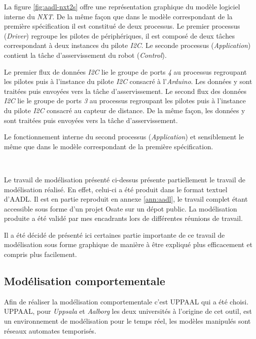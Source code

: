       La figure \ref{fig:aadl-nxt2s} offre une représentation graphique du
      modèle logiciel interne du {\it NXT}. De la même façon que dans le modèle
      correspondant de la première spécification il est constitué de deux
      processus. Le premier processus ({\it Driver}) regroupe les pilotes de
      périphériques, il est composé de deux tâches correspondant à deux
      instances du pilote {\it I2C}. Le seconde processus ({\it Application})
      contient la tâche d'asservissement du robot ({\it Control}).

      Le premier flux de données {\it I2C} lie le groupe de ports {\it 4} au
      processus regroupant les pilotes puis à l'instance du pilote {\it I2C}
      consacré à l'{\it Arduino}. Les données y sont traitées puis envoyées vers
      la tâche d'asservissement. Le second flux des données {\it I2C} lie le
      groupe de ports {\it 3} au processus regroupant les pilotes puis à
      l'instance du pilote {\it I2C} consacré au capteur de distance. De la même
      façon, les données y sont traitées puis envoyées vers la tâche
      d'asservissement.

      Le fonctionnement interne du second processus ({\it Application}) et
      sensiblement le même que dans le modèle correspondant de la première
      spécification. 
      
      ~

      Le travail de modélisation présenté ci-dessus présente partiellement le
      travail de modélisation réalisé. En effet, celui-ci a été produit dans le
      format textuel d'AADL. Il est en partie reproduit en annexe
      \ref{ann:aadl}, le travail complet étant accessible sous forme d'un projet
      Osate sur un dépot public\footnotemark. La modélisation produite a été
      validé par mes encadrants lors de différentes réunions de travail.
      
      Il a été décidé de présenté ici certaines partie importante de ce travail
      de modélisation sous forme graphique de manière à être expliqué plus
      efficacement et compris plus facilement.
      
    \subsection{Modélisation comportementale}

      Afin de réaliser la modélisation comportementale c'est UPPAAL \cite{uppaal}
      qui a été choisi. UPPAAL, pour {\it Uppsala} et {\it Aalborg} les deux
      universités à l'origine de cet outil, est un environnement de modélisation
      pour le temps réel, les modèles manipulés sont réseaux automates temporisés.

